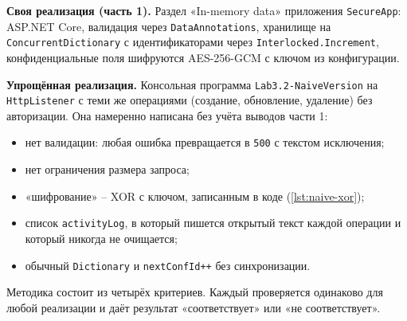 
\textbf{Своя реализация (часть 1).} Раздел «In-memory data» приложения
\texttt{SecureApp}: ASP.NET Core, валидация через \texttt{DataAnnotations},
хранилище на \texttt{ConcurrentDictionary} с идентификаторами через
\texttt{Interlocked.Increment}, конфиденциальные поля шифруются
AES-256-GCM с ключом из конфигурации.

\textbf{Упрощённая реализация.} Консольная программа
\texttt{Lab3.2-NaiveVersion} на \texttt{HttpListener} с теми же
операциями (создание, обновление, удаление) без авторизации. Она
намеренно написана без учёта выводов части 1:

\begin{itemize}
  \item нет валидации: любая ошибка превращается в \texttt{500} с текстом
  исключения;
  \item нет ограничения размера запроса;
  \item «шифрование» -- XOR с ключом, записанным в коде
  (\autoref{lst:naive-xor});
  \item список \texttt{activityLog}, в который пишется открытый текст
  каждой операции и который никогда не очищается;
  \item обычный \texttt{Dictionary} и \texttt{nextConfId++} без
  синхронизации.
\end{itemize}



Методика состоит из четырёх критериев. Каждый проверяется одинаково для
любой реализации и даёт результат «соответствует» или «не соответствует».

